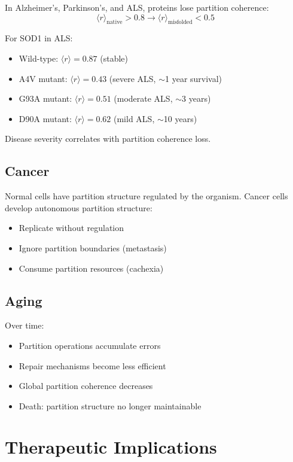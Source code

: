 \documentclass[twocolumn,10pt,a4paper]{article}
\theoremstyle{definition}
\theoremstyle{remark}
\newcommand{\Order}{\langle r \rangle}
\begin{document}
In Alzheimer's, Parkinson's, and ALS, proteins lose partition coherence:
\begin{equation}
    \Order_{\mathrm{native}} > 0.8 \to \Order_{\mathrm{misfolded}} < 0.5
\end{equation}

For SOD1 in ALS:
\begin{itemize}
    \item Wild-type: $\Order = 0.87$ (stable)
    \item A4V mutant: $\Order = 0.43$ (severe ALS, $\sim$1 year survival)
    \item G93A mutant: $\Order = 0.51$ (moderate ALS, $\sim$3 years)
    \item D90A mutant: $\Order = 0.62$ (mild ALS, $\sim$10 years)
\end{itemize}

Disease severity correlates with partition coherence loss.

\subsection{Cancer}

Normal cells have partition structure regulated by the organism. Cancer cells develop autonomous partition structure:
\begin{itemize}
    \item Replicate without regulation
    \item Ignore partition boundaries (metastasis)
    \item Consume partition resources (cachexia)
\end{itemize}

\subsection{Aging}

Over time:
\begin{itemize}
    \item Partition operations accumulate errors
    \item Repair mechanisms become less efficient
    \item Global partition coherence decreases
    \item Death: partition structure no longer maintainable
\end{itemize}

\section{Therapeutic Implications}
\label{sec:therapy}
\end{document}
